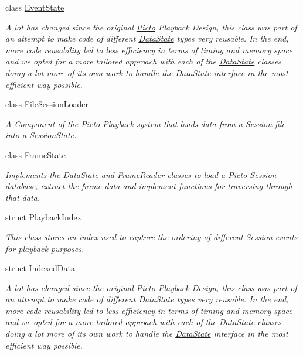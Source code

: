\begin{DoxyCompactItemize}
class \hyperlink{class_picto_1_1_event_state}{Event\-State}
\begin{DoxyCompactList}\small\item\em A lot has changed since the original \hyperlink{namespace_picto}{Picto} Playback Design, this class was part of an attempt to make code of different \hyperlink{class_picto_1_1_data_state}{Data\-State} types very reusable. In the end, more code reusability led to less efficiency in terms of timing and memory space and we opted for a more tailored approach with each of the \hyperlink{class_picto_1_1_data_state}{Data\-State} classes doing a lot more of its own work to handle the \hyperlink{class_picto_1_1_data_state}{Data\-State} interface in the most efficient way possible. \end{DoxyCompactList}\item 
class \hyperlink{class_picto_1_1_file_session_loader}{File\-Session\-Loader}
\begin{DoxyCompactList}\small\item\em A Component of the \hyperlink{namespace_picto}{Picto} Playback system that loads data from a Session file into a \hyperlink{class_picto_1_1_session_state}{Session\-State}. \end{DoxyCompactList}\item 
class \hyperlink{class_picto_1_1_frame_state}{Frame\-State}
\begin{DoxyCompactList}\small\item\em Implements the \hyperlink{class_picto_1_1_data_state}{Data\-State} and \hyperlink{class_picto_1_1_frame_reader}{Frame\-Reader} classes to load a \hyperlink{namespace_picto}{Picto} Session database, extract the frame data and implement functions for traversing through that data. \end{DoxyCompactList}\item 
struct \hyperlink{struct_picto_1_1_playback_index}{Playback\-Index}
\begin{DoxyCompactList}\small\item\em This class stores an index used to capture the ordering of different Session events for playback purposes. \end{DoxyCompactList}\item 
struct \hyperlink{struct_picto_1_1_indexed_data}{Indexed\-Data}
\begin{DoxyCompactList}\small\item\em A lot has changed since the original \hyperlink{namespace_picto}{Picto} Playback Design, this class was part of an attempt to make code of different \hyperlink{class_picto_1_1_data_state}{Data\-State} types very reusable. In the end, more code reusability led to less efficiency in terms of timing and memory space and we opted for a more tailored approach with each of the \hyperlink{class_picto_1_1_data_state}{Data\-State} classes doing a lot more of its own work to handle the \hyperlink{class_picto_1_1_data_state}{Data\-State} interface in the most efficient way possible. \end{DoxyCompactList}\item 

\end{DoxyCompactItemize}
